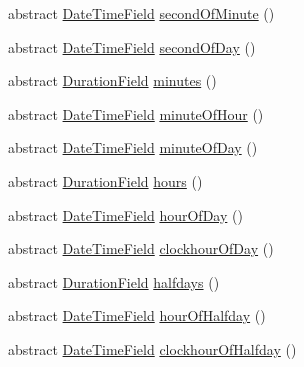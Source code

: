 \begin{DoxyCompactItemize}
\item 
abstract \hyperlink{classorg_1_1joda_1_1time_1_1_date_time_field}{Date\-Time\-Field} \hyperlink{classorg_1_1joda_1_1time_1_1_chronology_aced7aa86fcbf78c120494e55cde9e5cf}{second\-Of\-Minute} ()
\item 
abstract \hyperlink{classorg_1_1joda_1_1time_1_1_date_time_field}{Date\-Time\-Field} \hyperlink{classorg_1_1joda_1_1time_1_1_chronology_a4d75c63ae1a1e358ab41f4272c0c5ed6}{second\-Of\-Day} ()
\item 
abstract \hyperlink{classorg_1_1joda_1_1time_1_1_duration_field}{Duration\-Field} \hyperlink{classorg_1_1joda_1_1time_1_1_chronology_af76ecab8318d020b6831a5fb44fb7d69}{minutes} ()
\item 
abstract \hyperlink{classorg_1_1joda_1_1time_1_1_date_time_field}{Date\-Time\-Field} \hyperlink{classorg_1_1joda_1_1time_1_1_chronology_a8f34665d3a0651168f5706303f0fe527}{minute\-Of\-Hour} ()
\item 
abstract \hyperlink{classorg_1_1joda_1_1time_1_1_date_time_field}{Date\-Time\-Field} \hyperlink{classorg_1_1joda_1_1time_1_1_chronology_a693b7574d8a93f2340fb414ac1d2c9fa}{minute\-Of\-Day} ()
\item 
abstract \hyperlink{classorg_1_1joda_1_1time_1_1_duration_field}{Duration\-Field} \hyperlink{classorg_1_1joda_1_1time_1_1_chronology_a05cf5bf3633409fe7db50a616d2c9ec8}{hours} ()
\item 
abstract \hyperlink{classorg_1_1joda_1_1time_1_1_date_time_field}{Date\-Time\-Field} \hyperlink{classorg_1_1joda_1_1time_1_1_chronology_a37626b46ca11997b969bdf58ab84ce59}{hour\-Of\-Day} ()
\item 
abstract \hyperlink{classorg_1_1joda_1_1time_1_1_date_time_field}{Date\-Time\-Field} \hyperlink{classorg_1_1joda_1_1time_1_1_chronology_a9b76034aa72f2f2498dc65898f1ec199}{clockhour\-Of\-Day} ()
\item 
abstract \hyperlink{classorg_1_1joda_1_1time_1_1_duration_field}{Duration\-Field} \hyperlink{classorg_1_1joda_1_1time_1_1_chronology_ab248f57ff63b4292a5c1f7388226ae89}{halfdays} ()
\item 
abstract \hyperlink{classorg_1_1joda_1_1time_1_1_date_time_field}{Date\-Time\-Field} \hyperlink{classorg_1_1joda_1_1time_1_1_chronology_a35d69cf13132dd2dd6019ea73c1bca7c}{hour\-Of\-Halfday} ()
\item 
abstract \hyperlink{classorg_1_1joda_1_1time_1_1_date_time_field}{Date\-Time\-Field} \hyperlink{classorg_1_1joda_1_1time_1_1_chronology_a3231a7bcd8ff24acef87d6ed669b1858}{clockhour\-Of\-Halfday} ()
\item 

\end{DoxyCompactItemize}

